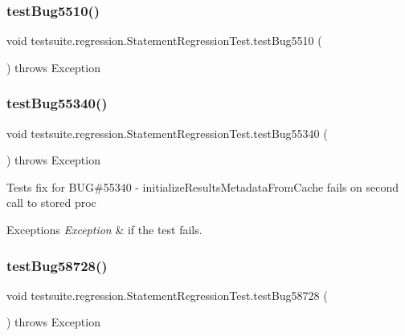 \subsubsection{\texorpdfstring{test\+Bug5510()}{testBug5510()}}
{\footnotesize\ttfamily void testsuite.\+regression.\+Statement\+Regression\+Test.\+test\+Bug5510 (\begin{DoxyParamCaption}{ }\end{DoxyParamCaption}) throws Exception}

\mbox{\label{classtestsuite_1_1regression_1_1_statement_regression_test_ad893290c719e6320a980acdd172851e7}} 
\subsubsection{\texorpdfstring{test\+Bug55340()}{testBug55340()}}
{\footnotesize\ttfamily void testsuite.\+regression.\+Statement\+Regression\+Test.\+test\+Bug55340 (\begin{DoxyParamCaption}{ }\end{DoxyParamCaption}) throws Exception}

Tests fix for B\+UG\#55340 -\/ initialize\+Results\+Metadata\+From\+Cache fails on second call to stored proc


\begin{DoxyExceptions}{Exceptions}
{\em Exception} & if the test fails. \\
\hline
\end{DoxyExceptions}
\mbox{\label{classtestsuite_1_1regression_1_1_statement_regression_test_a84dc5a1748d9651df8f09ae7b8e2fd2b}} 
\subsubsection{\texorpdfstring{test\+Bug58728()}{testBug58728()}}
{\footnotesize\ttfamily void testsuite.\+regression.\+Statement\+Regression\+Test.\+test\+Bug58728 (\begin{DoxyParamCaption}{ }\end{DoxyParamCaption}) throws Exception}

